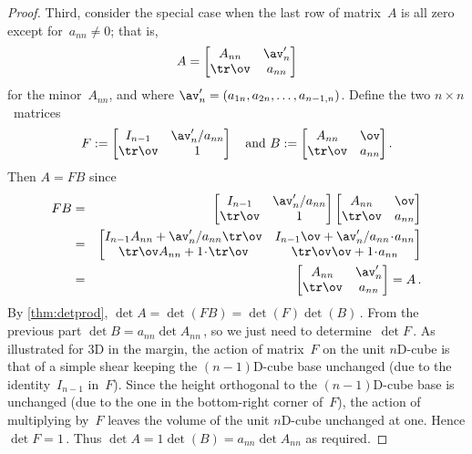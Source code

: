 \begin{proof}
Third, consider the special case when the last row of matrix~\(A\) is all zero except for~\(a_{nn}\neq0\); that is, 
\begin{equation*}
A=\begin{bmatrix} A_{nn}&\av_n'\\\tr\ov&a_{nn} \end{bmatrix}
\end{equation*}
for the minor~\(A_{nn}\), and where \(\av'_n=(a_{1n},a_{2n},\ldots,a_{n-1,n})\).
Define the two \(n\times n\)~matrices
\begin{equation*}
F:=\begin{bmatrix} I_{n-1}&\av'_n/a_{nn}\\\tr\ov& 1 \end{bmatrix}
\quad\text{and }
B:=\begin{bmatrix} A_{nn}&\ov\\\tr\ov&a_{nn} \end{bmatrix}.
\end{equation*}
Then \(A=FB\) since
\begin{eqnarray*}
FB&=&\begin{bmatrix} I_{n-1}&\av'_n/a_{nn}\\\tr\ov& 1 \end{bmatrix}
\begin{bmatrix} A_{nn}&\ov\\\tr\ov&a_{nn} \end{bmatrix}
\\&=&\begin{bmatrix} I_{n-1}A_{nn}+\av'_n/a_{nn}\tr\ov &
I_{n-1}\ov+\av'_n/a_{nn}\cdot a_{nn}\\
\tr\ov A_{nn}+1\cdot\tr\ov &
\tr\ov\ov+1\cdot a_{nn}  \end{bmatrix}
\\&=&\begin{bmatrix} A_{nn} &
\av'_n\\
\tr\ov  &
a_{nn}  \end{bmatrix} =A\,.
\end{eqnarray*}
By \autoref{thm:detprod}, \(\det A=\det(FB)=\det(F)\det(B)\)\,.
From the previous part \(\det B=a_{nn}\det A_{nn}\)\,, so we just need to determine~\(\det F\)\,.
As illustrated for 3D in the margin, the action of matrix~\(F\) on the unit \(n\)D-cube is that of a simple shear keeping the \((n-1)\)D-cube base unchanged (due to the identity~\(I_{n-1}\) in~\(F\)).
Since the height orthogonal to the \((n-1)\)D-cube base is unchanged (due to the one in the bottom-right corner of~\(F\)), the action of multiplying by~\(F\) leaves the volume of the unit \(n\)D-cube unchanged at one.
Hence \(\det F=1\)\,.
Thus \(\det A=1\det(B)=a_{nn}\det A_{nn}\) as required.


\end{proof}
